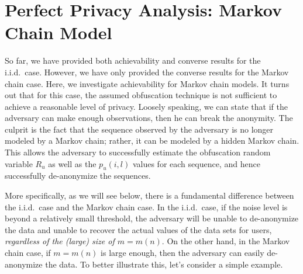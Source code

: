 \section{Perfect Privacy Analysis: Markov Chain Model}\label{sec:perfect-MC}
So far, we have provided both achievability and converse results for the i.i.d.\ case. However, we have only provided the converse results for the Markov chain case. Here, we investigate achievability for Markov chain models. It turns out that for this case, the assumed obfuscation technique is not sufficient to achieve a reasonable level of privacy. Loosely speaking, we can state that if the adversary can make enough observations, then he can break the anonymity. The culprit is the fact that the sequence observed by the adversary is no longer modeled by a Markov chain; rather, it can be modeled by a hidden Markov chain. This allows the adversary to successfully estimate the obfuscation random variable $R_u$ as well as the $ p_u(i,l)$ values for each sequence, and hence successfully de-anonymize the sequences.


More specifically, as we will see below, there is a fundamental difference between the i.i.d.\ case and the Markov chain case. In the i.i.d.\ case, if the noise level is beyond a relatively small threshold, the adversary will be unable to de-anonymize the data and unable to recover the actual values of the data sets for users, \emph{regardless of the (large) size of $m=m(n)$}. On the other hand, in the Markov chain case, if $m=m(n)$ is large enough, then the adversary can easily de-anonymize the data. To better illustrate this, let's consider a simple example.

